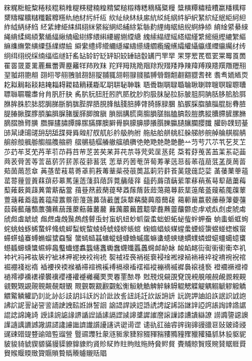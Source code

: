䊉䊊䊋䊌䊍䊎䊏䊐䊑䊒䊓䊔䊕䊖䊗䊘䊙䊚䊛䊜䊝䊞䊟䊠䊡
䊢䊣䊤䊥䊦䊧䊨䊩䊪䊫䊬䊭䊮䊯䊰䊱䊲䊳䊴䊵䊶䊷䊸䊹䊺
䊻䊼䊽䊾䊿䋀䋁䋂䋃䋄䋅䋆䋇䋈䋉䋊䋋䋌䋍䋎䋏䋐䋑䋒䋓
䋔䋕䋖䋗䋘䋙䋚䋛䋜䋝䋞䋟䋠䋡䋢䋣䋤䋥䋦䋧䋨䋩䋪䋫䋬
䋭䋮䋯䋰䋱䋲䋳䋴䋵䋶䋷䋸䋹䋺䋻䋼䋽䋾䋿䌀䌁䌂䌃䌄䌅
䌆䌇䌈䌉䌊䌋䌌䌍䌎䌏䌐䌑䌒䌓䌔䌕䌖䌗䌘䌙䌚䌛䌜䌝䌞
䌟䌠䌡䌢䌣䌤䌥䌦䌧䌨䌩䌪䌫䌬䌭䌮䌯䌰䌱䌲䌳䌴䌵䌶䌸
䌹䌺䌻䌼䌽䌾䌿䍀䍁䍂䍃䍄䍅䍆䍇䍈䍉䍊䍋䍌䍍䍎䍏䍐䍑
䍒䍓䍔䍕䍖䍗䍘䍙䍚䍛䍜䍝䍞䍟䍠䍡䍢䍣䍤䍥䍦䍧䍨䍩䍪
䍫䍬䍭䍮䍯䍰䍱䍲䍳䍴䍵䍶䍷䍸䍹䍺䍻䍼䍽䍾䍿䎀䎁䎂䎃
䎄䎅䎆䎇䎈䎉䎊䎋䎌䎍䎎䎏䎐䎑䎒䎓䎔䎕䎖䎗䎘䎙䎚䎛䎜
䎝䎞䎟䎠䎡䎢䎣䎤䎥䎦䎧䎨䎩䎪䎫䎭䎮䎯䎰䎲䎳䎴䎵䎶䎷
䎸䎹䎺䎻䎼䎽䎾䎿䏀䏁䏂䏃䏄䏅䏆䏇䏈䏉䏊䏋䏌䏍䏎䏏䏐
䏑䏒䏓䏔䏕䏖䏗䏘䏙䏚䏛䏜䏞䏟䏠䏡䏢䏣䏤䏥䏦䏧䏨䏩䏪
䏫䏬䏭䏮䏯䏰䏱䏲䏳䏴䏵䏶䏷䏸䏹䏺䏻䏼䏽䏾䏿䐀䐁䐂䐃
䐄䐅䐆䐇䐈䐉䐊䐋䐌䐍䐎䐏䐐䐑䐒䐓䐔䐕䐖䐗䐘䐙䐚䐛䐜
䐝䐞䐟䐠䐡䐢䐣䐤䐥䐦䐧䐨䐩䐪䐫䐬䐭䐮䐯䐰䐱䐲䐳䐴䐵
䐶䐷䐸䐹䐺䐻䐼䐽䐾䐿䑀䑁䑂䑃䑄䑅䑆䑇䑈䑉䑊䑋䑌䑍䑎
䑏䑐䑑䑒䑓䑔䑕䑖䑗䑘䑙䑚䑛䑜䑝䑞䑟䑠䑡䑢䑣䑤䑥䑦䑧
䑨䑩䑪䑫䑬䑭䑮䑯䑰䑱䑲䑳䑴䑵䑶䑷䑸䑹䑺䑻䑼䑽䑾䑿䒀
䒁䒂䒃䒄䒅䒆䒇䒈䒉䒊䒋䒌䒍䒎䒏䒐䒑䒒䒓䒔䒕䒖䒗䒘䒙
䒚䒛䒜䒝䒞䒟䒠䒡䒢䒣䒤䒥䒦䒧䒨䒩䒪䒫䒬䒭䒮䒯䒰䒱䒲
䒳䒴䒵䒶䒷䒸䒹䒺䒻䒼䒽䒾䒿䓀䓁䓂䓃䓄䓅䓆䓇䓈䓉䓊䓋
䓌䓍䓎䓏䓐䓑䓒䓓䓔䓕䓗䓘䓙䓚䓛䓜䓝䓞䓟䓠䓡䓢䓣䓤䓥
䓦䓧䓨䓩䓪䓫䓬䓭䓮䓯䓰䓱䓲䓳䓴䓵䓶䓷䓸䓹䓺䓻䓼䓽䓾
䓿䔀䔁䔂䔃䔄䔅䔆䔇䔈䔉䔊䔋䔌䔍䔎䔏䔐䔑䔒䔓䔔䔕䔖䔗
䔘䔙䔚䔛䔜䔝䔞䔟䔠䔡䔢䔣䔤䔥䔦䔧䔨䔩䔪䔫䔬䔭䔮䔯䔰
䔱䔲䔳䔴䔵䔶䔷䔸䔹䔺䔻䔼䔽䔾䔿䕀䕁䕂䕃䕄䕅䕆䕇䕈䕉
䕊䕋䕌䕍䕎䕏䕐䕑䕒䕓䕔䕕䕖䕗䕘䕙䕚䕛䕜䕝䕞䕟䕠䕡䕢
䕣䕤䕥䕦䕧䕨䕩䕪䕫䕬䕭䕮䕯䕰䕱䕲䕳䕴䕵䕶䕷䕸䕹䕺䕻
䕼䕽䕾䕿䖀䖁䖂䖃䖄䖅䖆䖇䖈䖉䖊䖋䖌䖍䖎䖏䖐䖑䖒䖓䖔
䖕䖖䖗䖘䖙䖚䖛䖜䖝䖞䖟䖠䖡䖢䖣䖤䖥䖦䖧䖨䖩䖪䖫䖬䖭
䖮䖯䖰䖱䖲䖳䖴䖵䖶䖷䖸䖹䖺䖻䖼䖽䖾䖿䗀䗁䗂䗃䗄䗅䗆
䗇䗈䗉䗊䗋䗌䗍䗎䗏䗐䗑䗒䗓䗔䗕䗖䗗䗘䗙䗚䗛䗜䗝䗞䗟
䗠䗡䗢䗣䗤䗥䗦䗧䗨䗩䗪䗫䗬䗭䗮䗯䗰䗱䗲䗳䗴䗵䗶䗷䗸
䗹䗺䗻䗼䗽䗾䗿䘀䘁䘂䘃䘄䘅䘆䘇䘈䘉䘊䘋䘌䘍䘎䘏䘐䘑
䘒䘓䘔䘕䘖䘗䘘䘙䘚䘛䘜䘝䘞䘟䘠䘡䘢䘣䘤䘥䘦䘧䘨䘩䘪
䘫䘬䘭䘮䘯䘰䘱䘲䘳䘴䘵䘶䘷䘸䘹䘺䘻䘼䘽䘾䘿䙀䙁䙂䙃
䙄䙅䙆䙇䙈䙉䙊䙋䙍䙎䙏䙐䙑䙒䙓䙔䙕䙖䙗䙘䙙䙚䙛䙜䙝
䙞䙟䙠䙢䙣䙤䙥䙦䙧䙨䙩䙪䙫䙬䙭䙮䙯䙰䙱䙲䙳䙴䙵䙶䙷
䙸䙹䙺䙻䙼䙽䙾䙿䚀䚁䚂䚃䚄䚅䚆䚇䚈䚉䚊䚋䚌䚍䚎䚏䚐
䚑䚒䚓䚔䚕䚖䚗䚘䚙䚚䚛䚜䚝䚞䚟䚠䚡䚢䚣䚤䚥䚦䚧䚨䚩
䚪䚫䚬䚭䚮䚯䚰䚱䚲䚳䚴䚵䚶䚷䚸䚹䚺䚻䚼䚽䚾䚿䛀䛁䛂
䛃䛄䛅䛆䛇䛈䛉䛊䛋䛌䛍䛎䛏䛐䛑䛒䛓䛔䛕䛖䛗䛘䛙䛚䛛
䛜䛝䛞䛟䛠䛡䛢䛣䛤䛥䛦䛧䛨䛩䛪䛫䛬䛭䛮䛯䛰䛱䛲䛳䛴
䛵䛶䛷䛸䛹䛺䛻䛼䛽䛾䛿䜀䜁䜂䜃䜄䜅䜆䜇䜈䜉䜊䜋䜌䜍
䜎䜏䜐䜑䜒䜓䜔䜕䜖䜗䜘䜙䜚䜛䜜䜝䜞䜟䜠䜡䜢䜤䜥䜦䜧
䜨䜪䜫䜬䜭䜮䜯䜰䜱䜲䜳䜴䜵䜶䜷䜸䜹䜺䜻䜼䜽䜾䜿䝀䝁
䝂䝃䝄䝅䝆䝇䝈䝉䝊䝋䝌䝍䝎䝏䝐䝑䝒䝓䝔䝕䝖䝗䝘䝙䝚
䝛䝜䝝䝞䝟䝠䝡䝢䝣䝤䝥䝦䝧䝨䝩䝪䝫䝬䝭䝮䝯䝰䝱䝲䝳
䝴䝵䝶䝷䝸䝹䝺䝻䝽䝾䝿䞀䞁䞂䞃䞄䞅䞆䞇䞈䞉䞊䞋䞌䞎
